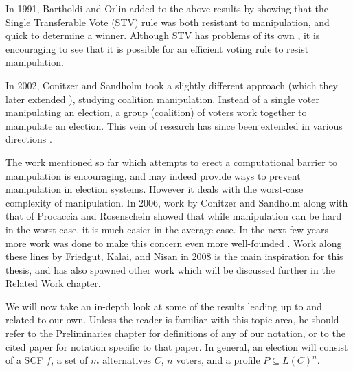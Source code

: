 	In 1991, Bartholdi and Orlin \cite{bartholdi1991single} added to the above results by showing that the Single Transferable Vote (STV) rule was both resistant to manipulation, and quick to determine a winner. Although STV has problems of its own \cite{brams1982ams, doron1977single, fishburn1983paradoxes, holzman1989vote, moulin1988condorcet}, it is encouraging to see that it is possible for an efficient voting rule to resist manipulation.

	In 2002, Conitzer and Sandholm took a slightly different approach \cite{conitzer2002vote} (which they later extended \cite{conitzer2007elections}), studying coalition manipulation. Instead of a single voter manipulating an election, a group (coalition) of voters work together to manipulate an election. This vein of research has since been extended in various directions \cite{conitzer2003universal, elkind2005hybrid, faliszewski2006complexity, hemaspaandra2007anyone, procaccia2007multi, elkind2005small}.

	The work mentioned so far which attempts to erect a computational barrier to manipulation is encouraging, and may indeed provide ways to prevent manipulation in election systems. However it deals with the worst-case complexity of manipulation. In 2006, work by Conitzer and Sandholm \cite{conitzer2006nonexistence} along with that of Procaccia and Rosenschein \cite{procaccia2006junta} showed that while manipulation can be hard in the worst case, it is much easier in the average case. In the next few years more work was done to make this concern even more well-founded \cite{procaccia2007average, erdelyi2007approximating}. Work along these lines by Friedgut, Kalai, and Nisan \cite{friedgut2008elections} in 2008 is the main inspiration for this thesis, and has also spawned other work which will be discussed further in the Related Work chapter.















	We will now take an in-depth look at some of the results leading up to and related to our own. Unless the reader is familiar with this topic area, he should refer to the Preliminaries chapter for definitions of any of our notation, or to the cited paper for notation specific to that paper. In general, an election will consist of a SCF $f$, a set of $m$ alternatives $C$, $n$ voters, and a profile $P \subseteq L(C)^n$.

